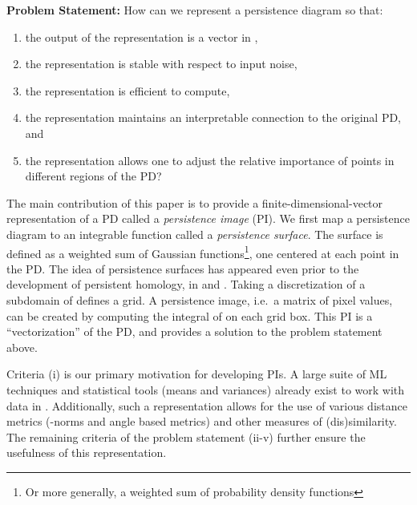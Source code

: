 \documentclass[11pt]{article}
\begin{document}
\vspace{0.5em}
\noindent\textbf{Problem Statement:} How can we represent a persistence diagram so that:
\begin{enumerate}[label=(\roman*)] 
\item the output of the representation is a vector in ,
\item the representation is stable with respect to input noise,
\item the representation is efficient to compute,
\item the representation maintains an interpretable connection to the original PD, and
\item\label{item:relativeImportance} the representation allows one to adjust the relative importance of points in different regions of the PD?
\end{enumerate}



The main contribution of this paper is to provide a finite-dimensional-vector representation of a PD called a \emph{persistence image} (PI). We first map a persistence diagram  to an integrable function  called a \emph{persistence surface}. The surface  is defined as a weighted sum of Gaussian functions\footnote{Or more generally, a weighted sum of probability density functions}, one centered at each point in the PD. The idea of persistence surfaces has appeared even prior to the development of persistent homology, in \citet{donatini1998size} and \cite{ferri1997point}. Taking a discretization of a subdomain of  defines a grid.  A persistence image, i.e.\ a matrix of pixel values, can be created by computing the integral of  on each grid box. This PI is a ``vectorization'' of the PD, and provides a solution to the problem statement above. 

Criteria (i) is our primary motivation for developing PIs.  A large suite of ML techniques and statistical tools (means and variances) already exist to work with data in .  Additionally, such a representation allows for the use of various distance metrics (-norms and angle based metrics) and other measures of (dis)similarity.  The remaining criteria of the problem statement (ii-v) further ensure the usefulness of this representation.  
\end{document}

